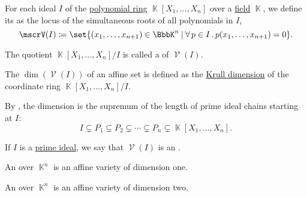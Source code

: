 \begin{definition}\label{def:affine_algebraic_set}
  For each ideal \( I \) of the \hyperref[def:polynomial_semiring]{polynomial ring} \( \BbbK[X_1, \ldots, X_n] \) over a \hyperref[def:field]{field} \( \BbbK \), we define its  as the locus of the simultaneous roots of all polynomials in \( I \),
  \begin{equation*}
    \mscrV(I) \coloneqq \set{ (x_1, \ldots, x_{n+1}) \in \BbbK^n \given \qforall {p \in I} p(x_1, \ldots, x_{n+1}) = 0 }.
  \end{equation*}

  \begin{thmenum}
     The quotient \( \BbbK[X_1, \ldots, X_n] / I \) is called a  of \( \mscrV(I) \).

     The  \( \dim(\mscrV(I)) \) of an affine set is defined as the \hyperref[def:krull_dimension]{Krull dimension} of the coordinate ring \( \BbbK[X_1, \ldots, X_n] / I \).

    By , the dimension is the supremum of the length of prime ideal chains starting at \( I \):
    \begin{equation*}
      I \subsetneq P_1 \subsetneq P_2 \subsetneq \cdots \subsetneq P_n \subsetneq \BbbK[X_1, \ldots, X_n].
    \end{equation*}

     If \( I \) is a \hyperref[def:semiring_ideal/prime]{prime ideal}, we say that \( \mscrV(I) \) is an .

     An  over \( \BbbK^n \) is an affine variety of dimension one.

     An  over \( \BbbK^n \) is an affine variety of dimension two.
  \end{thmenum}
\end{definition}

